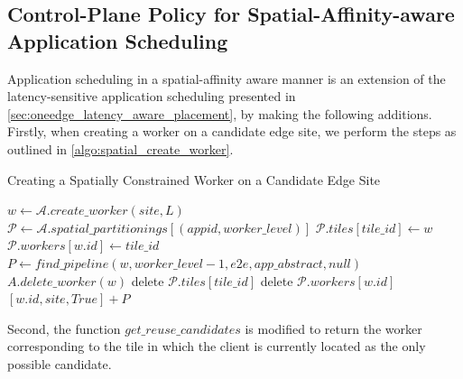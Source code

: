 \subsection{Control-Plane Policy for Spatial-Affinity-aware Application Scheduling}
Application scheduling in a spatial-affinity aware manner is an extension of the latency-sensitive application scheduling presented in \cref{sec:oneedge_latency_aware_placement}, by making the following additions. Firstly, when creating a worker on a candidate edge site, we perform the steps as outlined in \cref{algo:spatial_create_worker}.

\begin{algorithm}
\caption{Creating a Spatially Constrained Worker on a Candidate Edge Site}
\label{algo:spatial_create_worker}
\begin{algorithmic}[1]
\State $w \gets \mathcal{A}.create\_worker \left( site, L\right)$
    \State $\mathcal{P} \gets \mathcal{A}.spatial\_partitionings [\left( appid, worker\_level\right) ]$
    \State $\mathcal{P}.tiles[tile\_id] \gets w$
    \State $\mathcal{P}.workers[w.id] \gets tile\_id$
\EndIf
\State $P \gets find\_pipeline \left( w, worker\_level - 1, e2e, app\_abstract, null\right)$
    \State $A.delete\_worker \left( w \right)$
    \State delete $\mathcal{P}.tiles[tile\_id]$
    \State delete $\mathcal{P}.workers[w.id]$
\Else
    \State \Return $[w.id, site, True] + P$
\EndIf
\end{algorithmic}
\end{algorithm}

Second, the function $get\_reuse\_candidates$ is modified to return the worker corresponding to the tile in which the client is currently located as the only possible candidate.

